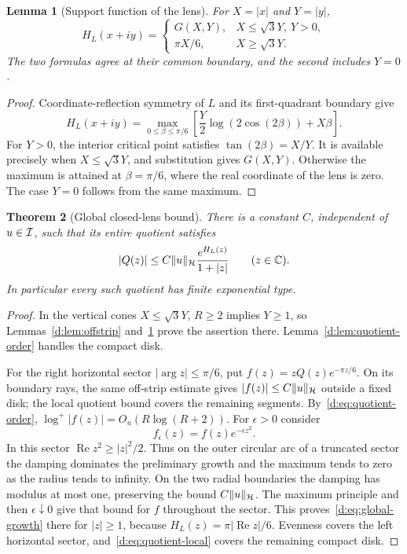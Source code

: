 \documentclass[11pt,a4paper]{article}
\numberwithin{equation}{section}
\newtheorem{theorem}{Theorem}[section]
\newtheorem{lemma}[theorem]{Lemma}
\theoremstyle{definition}\newtheorem{definition}[theorem]{Definition}
\theoremstyle{remark}\newtheorem{remark}[theorem]{Remark}
\newcommand{\Hh}{\mathcal H}\newcommand{\Hw}{\mathcal H}
\begin{document}
\begin{lemma}[Support function of the lens]\label{d:lem:lens-support}
For $X=|x|$ and $Y=|y|$,
\begin{equation}\label{d:eq:lens-support}
 H_L(x+iy)=
 \begin{cases}
 G(X,Y),&X\le\sqrt3Y,\ Y>0,\\
 \pi X/6,&X\ge\sqrt3Y.
 \end{cases}
\end{equation}
The two formulas agree at their common boundary, and the second includes $Y=0$.
\end{lemma}
\begin{proof}
Coordinate-reflection symmetry of $L$ and its first-quadrant boundary give
\[
 H_L(x+iy)=\max_{0\le\beta\le\pi/6}
 \left[\frac Y2\log(2\cos(2\beta))+X\beta\right].
\]
For $Y>0$, the interior critical point satisfies $\tan(2\beta)=X/Y$. It is available precisely when $X\le\sqrt3Y$, and substitution gives $G(X,Y)$. Otherwise the maximum is attained at $\beta=\pi/6$, where the real coordinate of the lens is zero. The case $Y=0$ follows from the same maximum.
\end{proof}

\begin{theorem}[Global closed-lens bound]\label{d:thm:global-growth}
There is a constant $C$, independent of $u\in\mathcal I$, such that its entire quotient satisfies
\begin{equation}\label{d:eq:global-growth}
 |Q(z)|\le C\norm{u}_{\Hh}\frac{e^{H_L(z)}}{1+|z|}
 \qquad(z\in\C).
\end{equation}
In particular every such quotient has finite exponential type.
\end{theorem}
\begin{proof}
In the vertical cones $X\le\sqrt3Y$, $R\ge2$ implies $Y\ge1$, so Lemmas~\ref{d:lem:offstrip} and~\ref{d:lem:lens-support} prove the assertion there. Lemma~\ref{d:lem:quotient-order} handles the compact disk.

For the right horizontal sector $|\arg z|\le\pi/6$, put
$f(z)=zQ(z)e^{-\pi z/6}$. On its boundary rays, the same off-strip estimate gives
$|f(z)|\le C\norm{u}_{\Hh}$ outside a fixed disk; the local quotient bound covers the remaining segments. By~\eqref{d:eq:quotient-order},
$\log^+|f(z)|=O_u(R\log(R+2))$.
For $\epsilon>0$ consider
\[
 f_\epsilon(z)=f(z)e^{-\epsilon z^2}.
\]
In this sector $\operatorname{Re}z^2\ge|z|^2/2$. Thus on the outer circular arc of a truncated sector the damping dominates the preliminary growth and the maximum tends to zero as the radius tends to infinity. On the two radial boundaries the damping has modulus at most one, preserving the bound $C\norm{u}_{\Hh}$. The maximum principle and then $\epsilon\downarrow0$ give that bound for $f$ throughout the sector. This proves~\eqref{d:eq:global-growth} there for $|z|\ge1$, because $H_L(z)=\pi|\operatorname{Re}z|/6$. Evenness covers the left horizontal sector, and~\eqref{d:eq:quotient-local} covers the remaining compact disk.
\end{proof}
\end{document}
